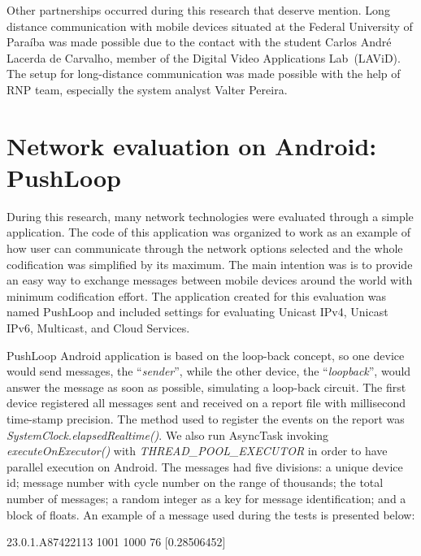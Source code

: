 Other partnerships occurred during this research that deserve mention.
Long distance communication with mobile devices situated at the Federal University of Paraíba was made possible due to the contact with the student Carlos André Lacerda de Carvalho, member of the Digital Video Applications Lab~(LAViD).
The setup for long-distance communication was made possible with the help of RNP team, especially the system analyst Valter Pereira.






\section{Network evaluation on Android: PushLoop}
\label{sec:apppushloop}

During this research, many network technologies were evaluated through a simple application.
The code of this application was organized to work as an example of how user can communicate through the network options selected and the whole codification was simplified by its maximum.
The main intention was is to provide an easy way to exchange messages between mobile devices around the world with minimum codification effort.
The application created for this evaluation was named PushLoop and included settings for evaluating Unicast IPv4, Unicast IPv6, Multicast, and Cloud Services.

PushLoop Android application is based on the loop-back concept, so one device would send messages, the ``\textit{sender}'', while the other device, the ``\textit{loopback}'', would answer the message as soon as possible, simulating a loop-back circuit.
The first device registered all messages sent and received on a report file with millisecond time-stamp precision.
The method used to register the events on the report was \textit{SystemClock.elapsedRealtime()}.
We also run AsyncTask invoking \textit{executeOnExecutor()} with \textit{THREAD\_POOL\_EXECUTOR} in order to have parallel execution on Android.
The messages had five divisions: a unique device id; message number with cycle number on the range of thousands; the total number of messages; a random integer as a key for message identification; and a block of floats.
An example of a message used during the tests is presented below:

\begin{footnotesize}
	\begin{center}
		23.0.1.A87422113 1001 1000 76 [0.28506452]
	\end{center}
\end{footnotesize}

